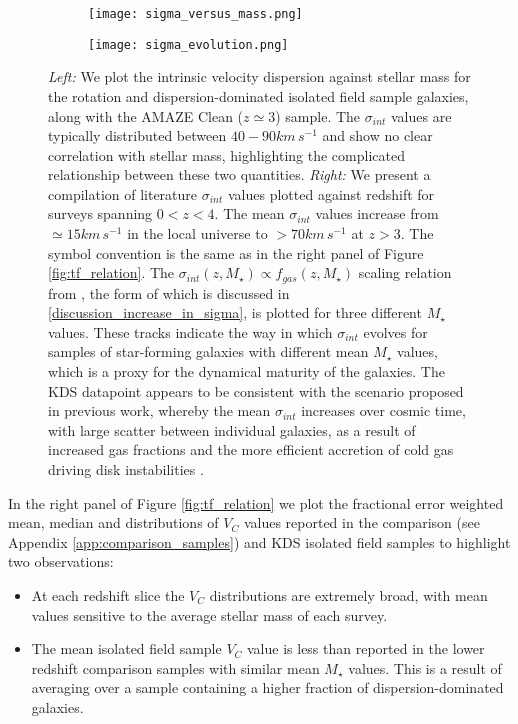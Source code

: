 \documentclass[fleqn,usenatbib]{mnras}
\begin{document}
\begin{figure*}
    \centering \hspace{-1.3cm}
    \begin{subfigure}[h!]{0.5\textwidth}
        \centering
        \texttt{[image: sigma\_versus\_mass.png]}
    \end{subfigure} \hspace{0.4cm}
    \begin{subfigure}[h!]{0.5\textwidth}
        \centering
        \texttt{[image: sigma\_evolution.png]}
    \end{subfigure}
    \caption{{\it Left:} We plot the intrinsic velocity dispersion against stellar mass for the rotation and dispersion-dominated isolated field sample galaxies, along with the AMAZE Clean ($z\simeq3$) sample.
    The $\sigma_{int}$ values are typically distributed between $40-90km\,s^{-1}$ and show no clear correlation with stellar mass, highlighting the complicated relationship between these two quantities. 
    {\it Right:} We present a compilation of literature $\sigma_{int}$ values plotted against redshift for surveys spanning $0 < z < 4$.
    The mean $\sigma_{int}$ values increase from $\simeq15km\,s^{-1}$ in the local universe to $> 70km\,s^{-1}$ at $z > 3$.
    The symbol convention is the same as in the right panel of Figure \protect\ref{fig:tf_relation}.
    The $\sigma_{int}(z,M_{\star})\propto f_{gas}(z,M_{\star})$ scaling relation from \protect\cite{Wisnioski2015}, the form of which is discussed in \protect\cref{discussion_increase_in_sigma}, is plotted for three different $M_{\star}$ values.
    These tracks indicate the way in which $\sigma_{int}$ evolves for samples of star-forming galaxies with different mean $M_{\star}$ values, which is a proxy for the dynamical maturity of the galaxies.
    The KDS datapoint appears to be consistent with the scenario proposed in previous work, whereby the mean $\sigma_{int}$ increases over cosmic time, with large scatter between individual galaxies, as a result of increased gas fractions \protect\citep{Wisnioski2015} and the more efficient accretion of cold gas driving disk instabilities \protect\citep[e.g.][]{Law2009,Genzel2011}.} 
    \label{fig:sigma_and_v_sigma_w_redshift}
\end{figure*}

In the right panel of Figure \ref{fig:tf_relation} we plot the fractional error weighted mean, median and distributions of $V_{C}$ values reported in the comparison (see Appendix \ref{app:comparison_samples}) and KDS isolated field samples to highlight two observations:
\begin{itemize}
    \item At each redshift slice the $V_{C}$ distributions are extremely broad, with mean values sensitive to the average stellar mass of each survey.
    \item The mean isolated field sample $V_{C}$ value is less than reported in the lower redshift comparison samples with similar mean $M_{\star}$ values.
    This is a result of averaging over a sample containing a higher fraction of dispersion-dominated galaxies.
\end{itemize}
\end{document}
